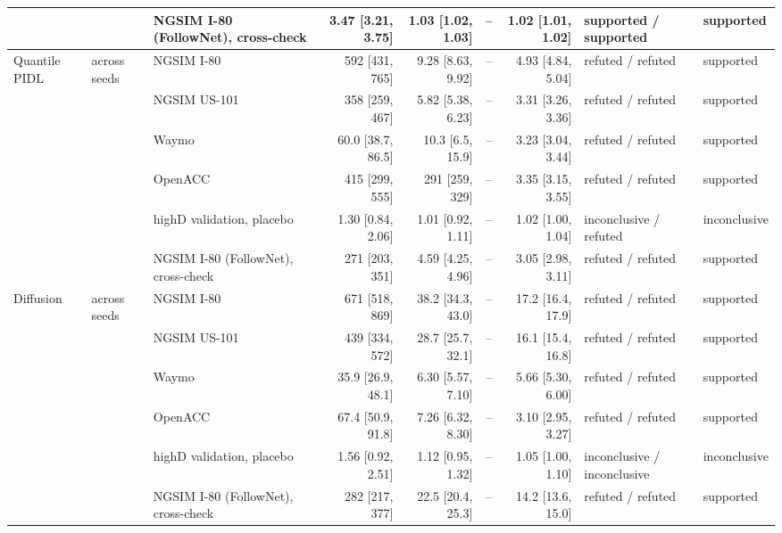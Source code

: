 \begin{longtable}{lllrrrrll}
 &  & NGSIM I-80 (FollowNet), cross-check & 3.47 [3.21, 3.75] & 1.03 [1.02, 1.03] & -- & 1.02 [1.01, 1.02] & supported / supported & supported \\
\midrule
Quantile PIDL & across seeds & NGSIM I-80 & 592 [431, 765] & 9.28 [8.63, 9.92] & -- & 4.93 [4.84, 5.04] & refuted / refuted & supported \\
 &  & NGSIM US-101 & 358 [259, 467] & 5.82 [5.38, 6.23] & -- & 3.31 [3.26, 3.36] & refuted / refuted & supported \\
 &  & Waymo & 60.0 [38.7, 86.5] & 10.3 [6.5, 15.9] & -- & 3.23 [3.04, 3.44] & refuted / refuted & supported \\
 &  & OpenACC & 415 [299, 555] & 291 [259, 329] & -- & 3.35 [3.15, 3.55] & refuted / refuted & supported \\
 &  & highD validation, placebo & 1.30 [0.84, 2.06] & 1.01 [0.92, 1.11] & -- & 1.02 [1.00, 1.04] & inconclusive / refuted & inconclusive \\
 &  & NGSIM I-80 (FollowNet), cross-check & 271 [203, 351] & 4.59 [4.25, 4.96] & -- & 3.05 [2.98, 3.11] & refuted / refuted & supported \\
\midrule
Diffusion & across seeds & NGSIM I-80 & 671 [518, 869] & 38.2 [34.3, 43.0] & -- & 17.2 [16.4, 17.9] & refuted / refuted & supported \\
 &  & NGSIM US-101 & 439 [334, 572] & 28.7 [25.7, 32.1] & -- & 16.1 [15.4, 16.8] & refuted / refuted & supported \\
 &  & Waymo & 35.9 [26.9, 48.1] & 6.30 [5.57, 7.10] & -- & 5.66 [5.30, 6.00] & refuted / refuted & supported \\
 &  & OpenACC & 67.4 [50.9, 91.8] & 7.26 [6.32, 8.30] & -- & 3.10 [2.95, 3.27] & refuted / refuted & supported \\
 &  & highD validation, placebo & 1.56 [0.92, 2.51] & 1.12 [0.95, 1.32] & -- & 1.05 [1.00, 1.10] & inconclusive / inconclusive & inconclusive \\
 &  & NGSIM I-80 (FollowNet), cross-check & 282 [217, 377] & 22.5 [20.4, 25.3] & -- & 14.2 [13.6, 15.0] & refuted / refuted & supported \\
\end{longtable}
\endgroup

